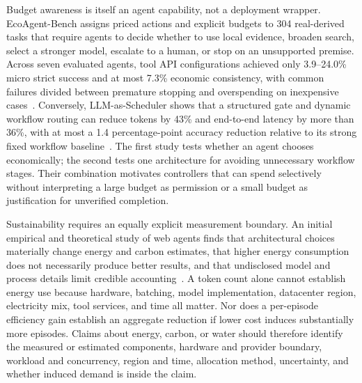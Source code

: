 Budget awareness is itself an agent capability, not a deployment wrapper. EcoAgent-Bench assigns priced actions and explicit budgets to 304 real-derived tasks that require agents to decide whether to use local evidence, broaden search, select a stronger model, escalate to a human, or stop on an unsupported premise. Across seven evaluated agents, tool API configurations achieved only 3.9--24.0\% micro strict success and at most 7.3\% economic consistency, with common failures divided between premature stopping and overspending on inexpensive cases~\cite{wu2026ecoagentbench}. Conversely, LLM-as-Scheduler shows that a structured gate and dynamic workflow routing can reduce tokens by 43\% and end-to-end latency by more than 36\%, with at most a 1.4 percentage-point accuracy reduction relative to its strong fixed workflow baseline~\cite{xiang2026scheduler}. The first study tests whether an agent chooses economically; the second tests one architecture for avoiding unnecessary workflow stages. Their combination motivates controllers that can spend selectively without interpreting a large budget as permission or a small budget as justification for unverified completion.

Sustainability requires an equally explicit measurement boundary. An initial empirical and theoretical study of web agents finds that architectural choices materially change energy and carbon estimates, that higher energy consumption does not necessarily produce better results, and that undisclosed model and process details limit credible accounting~\cite{krupp2025sustainablewebagents}. A token count alone cannot establish energy use because hardware, batching, model implementation, datacenter region, electricity mix, tool services, and time all matter. Nor does a per-episode efficiency gain establish an aggregate reduction if lower cost induces substantially more episodes. Claims about energy, carbon, or water should therefore identify the measured or estimated components, hardware and provider boundary, workload and concurrency, region and time, allocation method, uncertainty, and whether induced demand is inside the claim.

